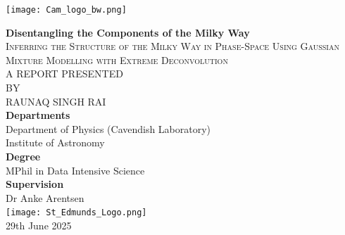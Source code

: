 \documentclass[a4paper,12pt]{article}
\begin{document}
\begin{titlepage}
    \centering
    \texttt{[image: Cam\_logo\_bw.png]}\\[1.5cm]


    \vspace{1cm}

    {\LARGE \bfseries Disentangling the Components of the Milky Way}\\[0.75cm]
    {\large \textsc{Inferring the Structure of the Milky Way in Phase-Space Using Gaussian Mixture Modelling with Extreme Deconvolution}}\\[1.5cm]


    \vspace{0.5cm}
    \large
    \textsc{A REPORT PRESENTED}\\[0.3cm]
    \textsc{BY}\\[0.3cm]
    \textsc{RAUNAQ SINGH RAI}\\[1cm]

    \normalsize
    \textbf{Departments}\\[0.3cm]
    Department of Physics (Cavendish Laboratory)\\
    Institute of Astronomy\\[1cm]

    \textbf{Degree}\\[0.3cm]
    MPhil in Data Intensive Science\\[1cm]

    \textbf{Supervision}\\[0.3cm]
    Dr Anke Arentsen\\

    \vfill
    \texttt{[image: St\_Edmunds\_Logo.png]}\\[0.25cm]
    29th June 2025

\end{titlepage}
\end{document}
